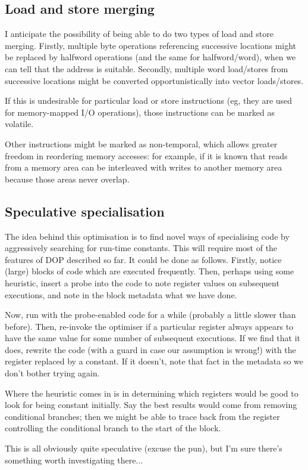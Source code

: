 \subsection{Load and store merging}

I anticipate the possibility of being able to do two types of load and store merging. Firstly, multiple byte operations referencing successive locations might be replaced by halfword operations (and the same for halfword/word), when we can tell that the address is suitable. Secondly, multiple word load/stores from successive locations might be converted opportunistically into vector loads/stores.

If this is undesirable for particular load or store instructions (eg, they are used for memory-mapped I/O operations), those instructions can be marked as volatile.

Other instructions might be marked as non-temporal, which allows greater freedom in reordering memory accesses: for example, if it is known that reads from a memory area can be interleaved with writes to another memory area because those areas never overlap.

\subsection{Speculative specialisation}

The idea behind this optimisation is to find novel ways of specialising code by aggressively searching for run-time constants. This will require most of the features of DOP described so far. It could be done as follows. Firstly, notice (large) blocks of code which are executed frequently. Then, perhaps using some heuristic, insert a probe into the code to note register values on subsequent executions, and note in the block metadata what we have done.

Now, run with the probe-enabled code for a while (probably a little slower than before). Then, re-invoke the optimiser if a particular register always appears to have the same value for some number of subsequent executions. If we find that it does, rewrite the code (with a guard in case our assumption is wrong!) with the register replaced by a constant. If it doesn't, note that fact in the metadata so we don't bother trying again.

Where the heuristic comes in is in determining which registers would be good to look for being constant initially. Say the best results would come from removing conditional branches; then we might be able to trace back from the register controlling the conditional branch to the start of the block.

This is all obviously quite speculative (excuse the pun), but I'm sure there's something worth investigating there...
